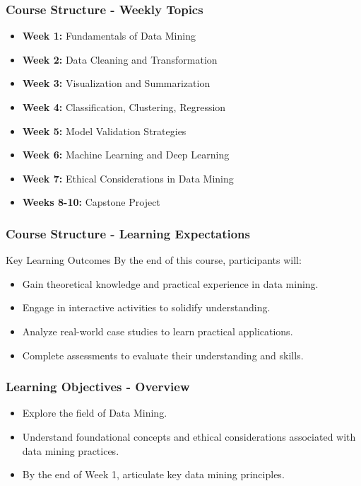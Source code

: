 \documentclass[aspectratio=169]{beamer}
\begin{document}
\begin{frame}[fragile]
    \frametitle{Course Structure - Weekly Topics}
    \begin{itemize}
        \item \textbf{Week 1:} Fundamentals of Data Mining
        \item \textbf{Week 2:} Data Cleaning and Transformation
        \item \textbf{Week 3:} Visualization and Summarization
        \item \textbf{Week 4:} Classification, Clustering, Regression
        \item \textbf{Week 5:} Model Validation Strategies
        \item \textbf{Week 6:} Machine Learning and Deep Learning
        \item \textbf{Week 7:} Ethical Considerations in Data Mining
        \item \textbf{Weeks 8-10:} Capstone Project
    \end{itemize}
\end{frame}

\begin{frame}[fragile]
    \frametitle{Course Structure - Learning Expectations}
    \begin{block}{Key Learning Outcomes}
        By the end of this course, participants will:
        \begin{itemize}
            \item Gain theoretical knowledge and practical experience in data mining.
            \item Engage in interactive activities to solidify understanding.
            \item Analyze real-world case studies to learn practical applications.
            \item Complete assessments to evaluate their understanding and skills.
        \end{itemize}
    \end{block}
\end{frame}

\begin{frame}[fragile]
    \frametitle{Learning Objectives - Overview}
    \begin{itemize}
        \item Explore the field of Data Mining.
        \item Understand foundational concepts and ethical considerations associated with data mining practices.
        \item By the end of Week 1, articulate key data mining principles.
    \end{itemize}
\end{frame}
\end{document}
